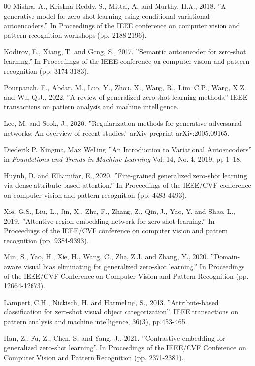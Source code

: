 \documentclass{article}
\begin{document}
\begin{thebibliography}{00}
 Mishra, A., Krishna Reddy, S., Mittal, A. and Murthy, H.A., 2018. ''A generative model for zero shot learning using conditional variational autoencoders.'' In Proceedings of the IEEE conference on computer vision and pattern recognition workshops (pp. 2188-2196).

 Kodirov, E., Xiang, T. and Gong, S., 2017. ''Semantic autoencoder for zero-shot learning.'' In Proceedings of the IEEE conference on computer vision and pattern recognition (pp. 3174-3183).

 Pourpanah, F., Abdar, M., Luo, Y., Zhou, X., Wang, R., Lim, C.P., Wang, X.Z. and Wu, Q.J., 2022. ''A review of generalized zero-shot learning methods.'' IEEE transactions on pattern analysis and machine intelligence.

 Lee, M. and Seok, J., 2020. ''Regularization methods for generative adversarial networks: An overview of recent studies.'' arXiv preprint arXiv:2005.09165.

 Diederik P. Kingma, Max Welling ''An Introduction to Variational Autoencoders'' in \emph{Foundations and Trends in Machine Learning} Vol. 14, No. 4, 2019, pp 1–18.

 Huynh, D. and Elhamifar, E., 2020. ''Fine-grained generalized zero-shot learning via dense attribute-based attention.'' In Proceedings of the IEEE/CVF conference on computer vision and pattern recognition (pp. 4483-4493).

 Xie, G.S., Liu, L., Jin, X., Zhu, F., Zhang, Z., Qin, J., Yao, Y. and Shao, L., 2019. ''Attentive region embedding network for zero-shot learning.'' In Proceedings of the IEEE/CVF conference on computer vision and pattern recognition (pp. 9384-9393).

 Min, S., Yao, H., Xie, H., Wang, C., Zha, Z.J. and Zhang, Y., 2020. ''Domain-aware visual bias eliminating for generalized zero-shot learning.'' In Proceedings of the IEEE/CVF Conference on Computer Vision and Pattern Recognition (pp. 12664-12673).

 Lampert, C.H., Nickisch, H. and Harmeling, S., 2013. ''Attribute-based classification for zero-shot visual object categorization''. IEEE transactions on pattern analysis and machine intelligence, 36(3), pp.453-465.

 Han, Z., Fu, Z., Chen, S. and Yang, J., 2021. ''Contrastive embedding for generalized zero-shot learning''. In Proceedings of the IEEE/CVF Conference on Computer Vision and Pattern Recognition (pp. 2371-2381).


\end{thebibliography}
\end{document}
